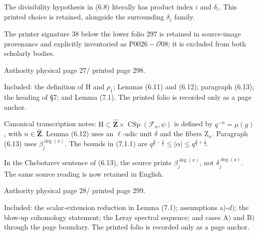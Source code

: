 \documentclass[10pt,leqno]{article}
\begin{document}
\noindent The divisibility hypothesis in (6.8) literally has product index \(i\) and \(\delta _{i}\). This printed choice is retained, alongside the surrounding \(\delta _{j}\) family.\par

\noindent The printer signature 38 below the lower folio 297 is retained in source-image provenance and explicitly inventoried as \(\mathrm{P}0026-\mathcal{O}08\); it is excluded from both scholarly bodies.\par

\clearpage

\label{physical-27}\par\smallskip

\noindent Authority physical page \(27 /\) printed page 298.\par

\noindent Included: the definition of \(\mathrm{H}\) and \(\rho _{1}\); Lemmas (6.11) and (6.12); paragraph (6.13); the heading of §7; and Lemma (7.1). The printed folio is recorded only as a page anchor.\par

\noindent Canonical transcription notes: \(\mathrm{H}\subset \widehat{\mathbf{Z}}\times \operatorname{CSp}(\mathcal{F} _{u},\psi )\) is defined by \(q^{- n}=\mu (g)\), with \(n\in \widehat{\mathbf{Z}}\). Lemma (6.12) uses an \(\ell \)-adic unit \(\delta \) and the fibers \(\mathrm{Z}_{n}\). Paragraph (6.13) uses \(\beta _{j}^{\operatorname{deg}(x)}\). The bounds in (7.1.1) are \(q^{\frac{d}{2}- \frac{1}{2}}\leq |\alpha |\leq q^{\frac{d}{2}+\frac{1}{2}}\).\par

\noindent In the Chebotarev sentence of (6.13), the source prints \(\beta _{j}^{\operatorname{deg}(x)}\), not \(\delta _{j}^{\operatorname{deg}(x)}\). The same source reading is now retained in English.\par

\clearpage

\label{physical-28}\par\smallskip

\noindent Authority physical page \(28 /\) printed page 299.\par

\noindent Included: the scalar-extension reduction in Lemma (7.1); assumptions a)-\(d)\); the blow-up cohomology statement; the Leray spectral sequence; and cases \(\mathrm{A})\) and \(\mathrm{B})\) through the page boundary. The printed folio is recorded only as a page anchor.\par
\end{document}
